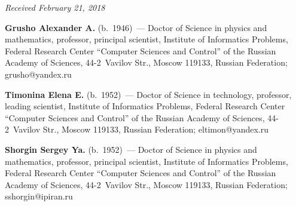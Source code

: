 \vspace*{-9pt}

\hfill{\small\textit{Received February 21, 2018}}




\Contr

\noindent
\textbf{Grusho Alexander A.} (b.\ 1946)~--- Doctor of Science in physics and 
mathematics, professor, principal scientist, Institute of Informatics Problems, Federal 
Research Center ``Computer Sciences and Control'' of the Russian Academy of 
Sciences, 44-2~Vavilov Str., Moscow 119133, Russian Federation; 
\mbox{grusho@yandex.ru} 

\vspace*{6pt}

\noindent
\textbf{Timonina Elena E.} (b.\ 1952)~--- Doctor of Science in technology, 
professor, leading scientist, Institute of Informatics Problems, Federal Research 
Center ``Computer Sciences and Control'' of the Russian Academy of Sciences,  
44-2~Vavilov Str., Moscow 119133, Russian Federation; 
\mbox{eltimon@yandex.ru} 

\vspace*{6pt}

\noindent
\textbf{Shorgin Sergey Ya.} (b.\ 1952)~--- Doctor of Science in physics and 
mathematics, professor, principal scientist, Institute of Informatics Problems, Federal 
Research Center ``Computer Sciences and Control'' of the Russian Academy of 
Sciences, 44-2~Vavilov Str., Moscow 119133, Russian Federation; 
\mbox{sshorgin@ipiran.ru} 

\label{end\stat}


\renewcommand{\bibname}{\protect\rm Литература} 